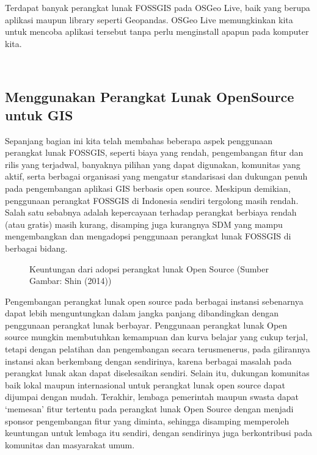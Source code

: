 \documentclass[letterpaper,10pt,english]{sphinxmanual}
\let\sphinxpxdimen\pdfpxdimen\else\newdimen\sphinxpxdimen
\begin{document}
Terdapat banyak perangkat lunak FOSS\sphinxhyphen{}GIS pada OSGeo Live, baik yang berupa aplikasi maupun library seperti Geopandas. OSGeo Live memungkinkan kita untuk mencoba aplikasi tersebut tanpa perlu menginstall apapun pada komputer kita.

 


\subsection{Menggunakan Perangkat Lunak OpenSource untuk GIS}
\label{\detokenize{sesi1/fossgis:menggunakan-perangkat-lunak-opensource-untuk-gis}}
Sepanjang bagian ini kita telah membahas beberapa aspek penggunaan perangkat lunak FOSS\sphinxhyphen{}GIS, seperti biaya yang rendah, pengembangan fitur dan rilis yang terjadwal, banyaknya pilihan yang dapat digunakan, komunitas yang aktif, serta berbagai organisasi yang mengatur standarisasi dan dukungan penuh pada pengembangan aplikasi GIS berbasis open source. Meskipun demikian, penggunaan perangkat FOSS\sphinxhyphen{}GIS di Indonesia sendiri tergolong masih rendah. Salah satu sebabnya adalah kepercayaan terhadap perangkat berbiaya rendah (atau gratis) masih kurang, disamping juga kurangnya SDM yang mampu mengembangkan dan mengadopsi penggunaan perangkat lunak FOSS\sphinxhyphen{}GIS di berbagai bidang.

\begin{figure}[htbp]
\centering
\capstart

\noindent\sphinxincludegraphics[height=300\sphinxpxdimen]{{2020-12-07-13-09-54}.png}
\caption{Keuntungan dari adopsi perangkat lunak Open Source (Sumber Gambar: Shin (2014))}\label{\detokenize{sesi1/fossgis:adopsi}}\end{figure}

Pengembangan perangkat lunak open source pada berbagai instansi sebenarnya dapat lebih menguntungkan dalam jangka panjang dibandingkan dengan penggunaan perangkat lunak berbayar. Penggunaan perangkat lunak Open source mungkin membutuhkan kemampuan dan kurva belajar yang cukup terjal, tetapi dengan pelatihan dan pengembangan secara terus\sphinxhyphen{}menerus, pada gilirannya instansi akan berkembang dengan sendirinya, karena berbagai masalah pada perangkat lunak akan dapat diselesaikan sendiri. Selain itu, dukungan komunitas baik lokal maupun internasional untuk perangkat lunak open source dapat dijumpai dengan mudah. Terakhir, lembaga pemerintah maupun swasta dapat ‘memesan’ fitur tertentu pada perangkat lunak Open Source dengan menjadi sponsor pengembangan fitur yang diminta, sehingga disamping memperoleh keuntungan untuk lembaga itu sendiri, dengan sendirinya juga berkontribusi pada komunitas dan masyarakat umum.
\end{document}
